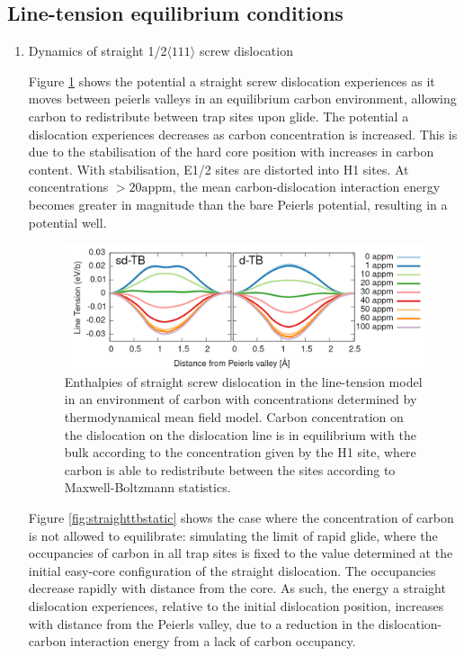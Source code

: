 \documentclass[a4paper,12pt,oneside,print,numbered,index,PageStyleIII]{PhDThesisPSnPDF}
\begin{document}
\subsection{Line-tension equilibrium conditions}
\label{sec:orga9d5b33}

\begin{enumerate}
\item Dynamics of straight 1/2\(\langle 111 \rangle\) screw dislocation
\label{sec:org9233989}

Figure \ref{fig:straighttbequib} shows the potential a straight screw
dislocation experiences as it moves between peierls valleys in an
equilibrium carbon environment, allowing carbon to redistribute between trap
sites upon glide. The potential a dislocation experiences decreases as
carbon concentration is increased. This is due to the stabilisation of the
hard core position with increases in carbon content. With stabilisation,
E1/2 sites are distorted into H1 sites. At concentrations \(\gt
     20\text{appm}\), the mean carbon-dislocation interaction energy becomes
greater in magnitude than the bare Peierls potential, resulting in a
potential well.


\begin{figure}[htbp]
\centering
\includegraphics[width=.9\linewidth]{iron/Images/straight_line_enthalpies_equib_both.png}
\caption{Enthalpies of straight screw dislocation in the line-tension model in an environment of carbon with concentrations determined by thermodynamical mean field model. Carbon concentration on the dislocation on the dislocation line is in equilibrium with the bulk according to the concentration given by the H1 site, where carbon is able to redistribute between the sites according to Maxwell-Boltzmann statistics. \label{fig:straighttbequib}}
\end{figure}



Figure \ref{fig:straighttbstatic} shows the case where the concentration of
carbon is not allowed to equilibrate: simulating the limit of rapid glide,
where the occupancies of carbon in all trap sites is fixed to the value
determined at the initial easy-core configuration of the straight
dislocation. The occupancies decrease rapidly with distance from the
core. As such, the energy a straight dislocation experiences, relative to the initial
dislocation position, increases with
distance from the Peierls valley, due to a reduction in the
dislocation-carbon interaction energy from a lack of carbon occupancy.



\end{enumerate}
\end{document}
